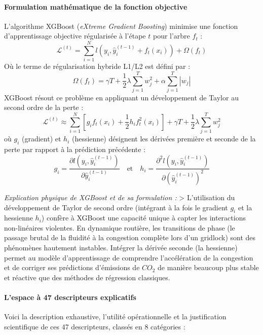 \documentclass[10pt, a4paper]{article}
\begin{document}
\paragraph{Formulation mathématique de la fonction
objective}\label{formulation-mathuxe9matique-de-la-fonction-objective}

L'algorithme XGBoost (\emph{eXtreme Gradient Boosting}) minimise une
fonction d'apprentissage objective régularisée à l'étape \(t\) pour
l'arbre \(f_t\) :
\[\mathcal{L}^{(t)} = \sum_{i=1}^N l\left(y_i, \hat{y}_i^{(t-1)} + f_t(x_i)\right) + \Omega(f_t)\]
Où le terme de régularisation hybride L1/L2 est défini par :
\[\Omega(f_t) = \gamma T + \frac{1}{2} \lambda \sum_{j=1}^T w_j^2 + \alpha \sum_{j=1}^T |w_j|\]
XGBoost résout ce problème en appliquant un développement de Taylor au
second ordre de la perte :
\[\mathcal{L}^{(t)} \approx \sum_{i=1}^N \left[ g_i f_t(x_i) + \frac{1}{2} h_i f_t^2(x_i) \right] + \gamma T + \frac{1}{2} \lambda \sum_{j=1}^T w_j^2\]
où \(g_i\) (gradient) et \(h_i\) (hessienne) désignent les dérivées
première et seconde de la perte par rapport à la prédiction précédente :
\[g_i = \frac{\partial l\left(y_i, \hat{y}_i^{(t-1)}\right)}{\partial \hat{y}_i^{(t-1)}} \quad \text{et} \quad h_i = \frac{\partial^2 l\left(y_i, \hat{y}_i^{(t-1)}\right)}{\partial \left(\hat{y}_i^{(t-1)}\right)^2}\]

\emph{Explication physique de XGBoost et de sa formulation :}
\textgreater{} L'utilisation du développement de Taylor de second ordre
(intégrant à la fois le gradient \(g_i\) et la hessienne \(h_i\))
confère à XGBoost une capacité unique à capter les interactions
non-linéaires violentes. En dynamique routière, les transitions de phase
(le passage brutal de la fluidité à la congestion complète lors d'un
gridlock) sont des phénomènes hautement instables. Intégrer la dérivée
seconde (la hessienne) permet au modèle d'apprentissage de comprendre
l'accélération de la congestion et de corriger ses prédictions
d'émissions de \(CO_2\) de manière beaucoup plus stable et réactive que
des méthodes de régression classiques.

\paragraph{L'espace à 47 descripteurs
explicatifs}\label{lespace-uxe0-47-descripteurs-explicatifs}

Voici la description exhaustive, l'utilité opérationnelle et la
justification scientifique de ces 47 descripteurs, classés en 8
catégories :
\end{document}
